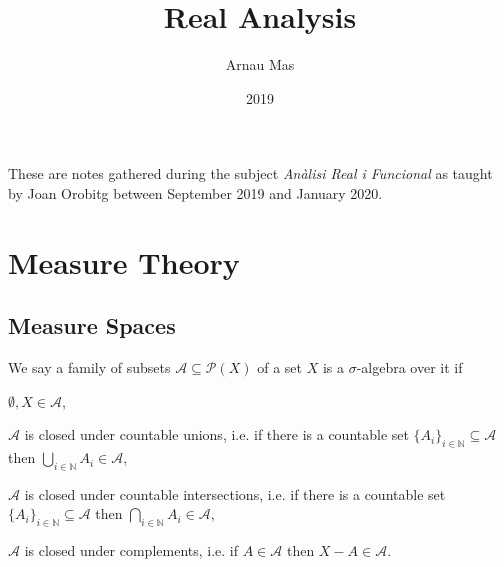 \documentclass[12pt,oneside]{book}
\title{Real Analysis}
\author{Arnau Mas}
\date{2019}
\numberwithin{table}{section}
\numberwithin{equation}{section}
\numberwithin{figure}{section}
\newcommand{\N}{\mathbb{N}}
\newcommand{\A}{\mathcal{A}}
\renewcommand{\P}{\mathcal{P}}
\begin{document}
\maketitle

\frontmatter
\pagestyle{plain}
These are notes gathered during the subject \emph{Anàlisi Real i Funcional} as taught by Joan Orobitg between September 2019 and January 2020.

\mainmatter

\chapter{Measure Theory}
\section{Measure Spaces}
\begin{defn}
	We say a family of subsets \( \A \subseteq \P(X) \) of a set \( X \) is a \( \sigma \)-algebra over it if
	\begin{points}
	\item \( \emptyset, X \in \A \),
	\item \( \A \) is closed under countable unions, i.e. if there is a countable set \( \{ A_i \}_{i \in \N} \subseteq \A \) then \( \bigcup_{i \in \N} A_i \in \A \),
	\item \( \A \) is closed under countable intersections, i.e. if there is a countable set \( \{ A_i \}_{i \in \N} \subseteq \A \) then \( \bigcap_{i \in \N} A_i \in \A \),
	\item \( \A \) is closed under complements, i.e. if \( A \in \A \) then \( X - A \in \A \).
	\end{points}
\end{defn}
\end{document}
